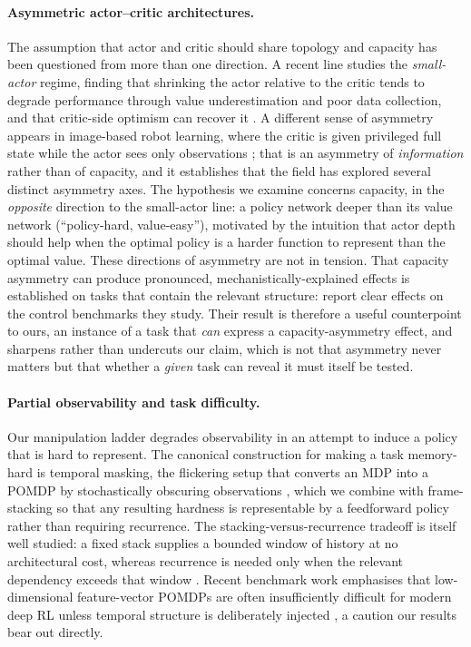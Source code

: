 \documentclass[10pt]{article}
\begin{document}
\paragraph{Asymmetric actor--critic architectures.} The assumption that actor and critic
should share topology and capacity has been questioned from more than one direction. A
recent line studies the \emph{small-actor} regime, finding that shrinking the actor relative
to the critic tends to degrade performance through value underestimation and poor data
collection, and that critic-side optimism can recover it
\citep{mastikhina2025optimistic}. A different sense of asymmetry appears in image-based
robot learning, where the critic is given privileged full state while the actor sees only
observations \citep{pinto2018asymmetric}; that is an asymmetry of \emph{information} rather
than of capacity, and it establishes that the field has explored several distinct asymmetry
axes. The hypothesis we examine concerns capacity, in the \emph{opposite} direction to the
small-actor line: a policy network deeper than its value network (``policy-hard,
value-easy''), motivated by the intuition that actor depth should help when the optimal
policy is a harder function to represent than the optimal value. These directions of
asymmetry are not in tension. That capacity asymmetry can produce pronounced,
mechanistically-explained effects is established on tasks that contain the relevant
structure: \citet{mastikhina2025optimistic} report clear effects on the control benchmarks
they study. Their result is therefore a useful counterpoint to ours, an instance of a task
that \emph{can} express a capacity-asymmetry effect, and sharpens rather than undercuts our
claim, which is not that asymmetry never matters but that whether a \emph{given} task can
reveal it must itself be tested.

\paragraph{Partial observability and task difficulty.} Our manipulation ladder degrades
observability in an attempt to induce a policy that is hard to represent. The canonical
construction for making a task memory-hard is temporal masking, the flickering setup that
converts an MDP into a POMDP by stochastically obscuring observations
\citep{hausknecht2015drqn}, which we combine with frame-stacking \citep{mnih2015human} so
that any resulting hardness is representable by a feedforward policy rather than requiring
recurrence. The stacking-versus-recurrence tradeoff is itself well studied: a fixed stack
supplies a bounded window of history at no architectural cost, whereas recurrence is needed
only when the relevant dependency exceeds that window \citep{kapturowski2019r2d2}. Recent
benchmark work emphasises that low-dimensional feature-vector POMDPs are often
insufficiently difficult for modern deep RL unless temporal structure is deliberately
injected \citep{morad2023popgym}, a caution our results bear out directly.
\end{document}
